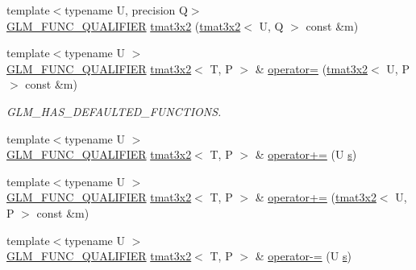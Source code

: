 \begin{DoxyCompactItemize}
\item 
{\footnotesize template$<$typename U, precision Q$>$ }\\\mbox{\hyperlink{setup_8hpp_a33fdea6f91c5f834105f7415e2a64407}{G\+L\+M\+\_\+\+F\+U\+N\+C\+\_\+\+Q\+U\+A\+L\+I\+F\+I\+ER}} \mbox{\hyperlink{structglm_1_1tmat3x2_ad33526a04ab8966123185267eb201755}{tmat3x2}} (\mbox{\hyperlink{structglm_1_1tmat3x2}{tmat3x2}}$<$ U, Q $>$ const \&m)
\item 
{\footnotesize template$<$typename U $>$ }\\\mbox{\hyperlink{setup_8hpp_a33fdea6f91c5f834105f7415e2a64407}{G\+L\+M\+\_\+\+F\+U\+N\+C\+\_\+\+Q\+U\+A\+L\+I\+F\+I\+ER}} \mbox{\hyperlink{structglm_1_1tmat3x2}{tmat3x2}}$<$ T, P $>$ \& \mbox{\hyperlink{structglm_1_1tmat3x2_ac868522f7be6e78c28c6d00deb181060}{operator=}} (\mbox{\hyperlink{structglm_1_1tmat3x2}{tmat3x2}}$<$ U, P $>$ const \&m)
\begin{DoxyCompactList}\small\item\em G\+L\+M\+\_\+\+H\+A\+S\+\_\+\+D\+E\+F\+A\+U\+L\+T\+E\+D\+\_\+\+F\+U\+N\+C\+T\+I\+O\+NS. \end{DoxyCompactList}\item 
{\footnotesize template$<$typename U $>$ }\\\mbox{\hyperlink{setup_8hpp_a33fdea6f91c5f834105f7415e2a64407}{G\+L\+M\+\_\+\+F\+U\+N\+C\+\_\+\+Q\+U\+A\+L\+I\+F\+I\+ER}} \mbox{\hyperlink{structglm_1_1tmat3x2}{tmat3x2}}$<$ T, P $>$ \& \mbox{\hyperlink{structglm_1_1tmat3x2_a36d12514d28052aae7538bba36709e81}{operator+=}} (U \mbox{\hyperlink{glad_8h_af1b1d5edfea6a34daee7389b1b5810ad}{s}})
\item 
{\footnotesize template$<$typename U $>$ }\\\mbox{\hyperlink{setup_8hpp_a33fdea6f91c5f834105f7415e2a64407}{G\+L\+M\+\_\+\+F\+U\+N\+C\+\_\+\+Q\+U\+A\+L\+I\+F\+I\+ER}} \mbox{\hyperlink{structglm_1_1tmat3x2}{tmat3x2}}$<$ T, P $>$ \& \mbox{\hyperlink{structglm_1_1tmat3x2_aab711028912b77b4658892c5a1a3a5a9}{operator+=}} (\mbox{\hyperlink{structglm_1_1tmat3x2}{tmat3x2}}$<$ U, P $>$ const \&m)
\item 
{\footnotesize template$<$typename U $>$ }\\\mbox{\hyperlink{setup_8hpp_a33fdea6f91c5f834105f7415e2a64407}{G\+L\+M\+\_\+\+F\+U\+N\+C\+\_\+\+Q\+U\+A\+L\+I\+F\+I\+ER}} \mbox{\hyperlink{structglm_1_1tmat3x2}{tmat3x2}}$<$ T, P $>$ \& \mbox{\hyperlink{structglm_1_1tmat3x2_a94092701c91edec5ab93035af7a3422b}{operator-\/=}} (U \mbox{\hyperlink{glad_8h_af1b1d5edfea6a34daee7389b1b5810ad}{s}})
\item 

\end{DoxyCompactItemize}
